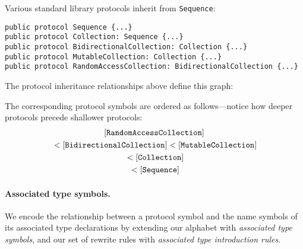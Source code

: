 \documentclass[../generics]{subfiles}
\begin{document}
\begin{example}\label{protocol reduction order example}
Various standard library protocols inherit from \texttt{Sequence}:
\begin{Verbatim}
public protocol Sequence {...}
public protocol Collection: Sequence {...}
public protocol BidirectionalCollection: Collection {...}
public protocol MutableCollection: Collection {...}
public protocol RandomAccessCollection: BidirectionalCollection {...}
\end{Verbatim}
The protocol inheritance relationships above define this graph:
\begin{center}
\end{center}
The corresponding protocol symbols are ordered as follows---notice how deeper protocols precede shallower protocols:
\begin{gather*}
[\texttt{RandomAccessCollection}]\\
{} < [\texttt{BidirectionalCollection}]<[\texttt{MutableCollection}]\\
{} < [\texttt{Collection}]\\
{} < [\texttt{Sequence}]
\end{gather*}
\end{example}

\paragraph{Associated type symbols.}
We encode the relationship between a protocol symbol and the name symbols of its associated type declarations by extending our alphabet with \emph{associated type symbols}, and our set of rewrite rules with \emph{associated type introduction rules}.
\end{document}
